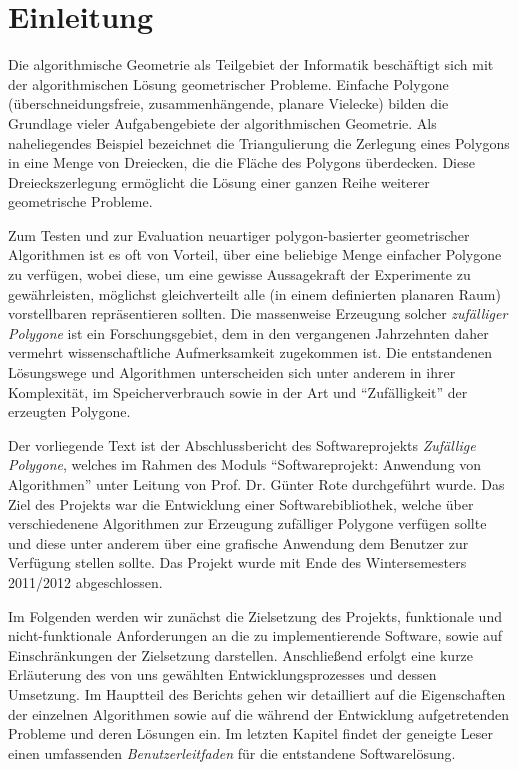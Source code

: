 \section{Einleitung}
Die algorithmische Geometrie als Teilgebiet der Informatik beschäftigt sich mit der algorithmischen Lösung geometrischer Probleme. Einfache Polygone (überschneidungsfreie, zusammenhängende, planare Vielecke) bilden die Grundlage vieler Aufgabengebiete der algorithmischen Geometrie. Als naheliegendes Beispiel bezeichnet die Triangulierung die Zerlegung eines Polygons in eine Menge von Dreiecken, die die Fläche des Polygons überdecken. Diese Dreieckszerlegung ermöglicht die Lösung einer ganzen Reihe weiterer geometrische Probleme.

Zum Testen und zur Evaluation neuartiger polygon-basierter geometrischer Algorithmen ist es oft von Vorteil, über eine beliebige Menge einfacher Polygone zu verfügen, wobei diese, um eine gewisse Aussagekraft der Experimente zu gewährleisten, möglichst gleichverteilt alle (in einem definierten planaren Raum) vorstellbaren repräsentieren sollten. Die massenweise Erzeugung solcher \emph{zufälliger Polygone} ist ein Forschungsgebiet, dem in den vergangenen Jahrzehnten daher vermehrt wissenschaftliche Aufmerksamkeit zugekommen ist. Die entstandenen Lösungswege und Algorithmen unterscheiden sich unter anderem in ihrer Komplexität, im Speicherverbrauch sowie in der Art und \enquote{Zufälligkeit} der erzeugten Polygone.

Der vorliegende Text ist der Abschlussbericht des Softwareprojekts \emph{Zufällige Polygone}, welches im Rahmen des Moduls \enquote{Softwareprojekt: Anwendung von Algorithmen} unter Leitung von Prof. Dr. Günter Rote durchgeführt wurde. Das Ziel des Projekts war die Entwicklung einer Softwarebibliothek, welche über verschiedenene Algorithmen zur Erzeugung zufälliger Polygone verfügen sollte und diese unter anderem über eine grafische Anwendung dem Benutzer zur Verfügung stellen sollte. Das Projekt wurde mit Ende des Wintersemesters 2011/2012 abgeschlossen.

Im Folgenden werden wir zunächst die Zielsetzung des Projekts, funktionale und nicht-funktionale Anforderungen an die zu implementierende Software, sowie auf Einschränkungen der Zielsetzung darstellen. Anschließend erfolgt eine kurze Erläuterung des von uns gewählten Entwicklungsprozesses und dessen Umsetzung. Im Hauptteil des Berichts gehen wir detailliert auf die Eigenschaften der einzelnen Algorithmen sowie auf die während der Entwicklung aufgetretenden Probleme und deren Lösungen ein. Im letzten Kapitel findet der geneigte Leser einen umfassenden \emph{Benutzerleitfaden} für die entstandene Softwarelösung.
